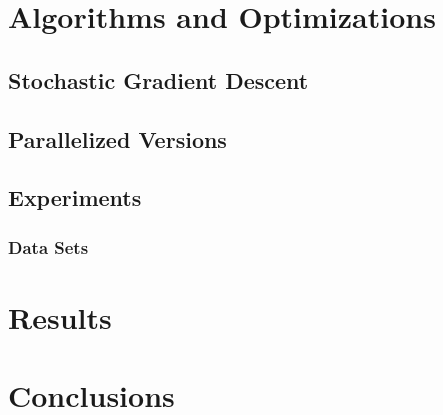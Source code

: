 \documentclass{article}
\begin{document}
\section{Algorithms and Optimizations}
\subsection{Stochastic Gradient Descent}
\subsection{Parallelized Versions}
\subsection{Experiments}
\subsubsection{Data Sets}
\section{Results}
\section{Conclusions}



\end{document}
